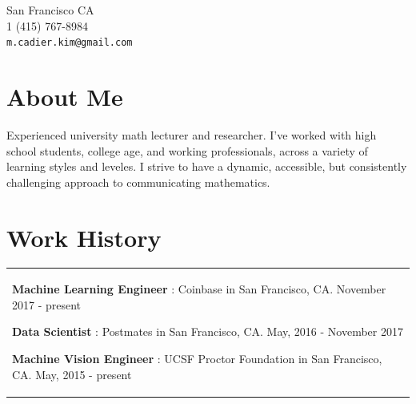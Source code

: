 \documentclass[margin,line,pifont,palatino,courier]{res}
\newenvironment{list1}{
  \begin{list}{\label{ } }{
      \setlength{\itemsep}{0in}
      \setlength{\parsep}{0in} \setlength{\parskip}{0in}
      \setlength{\topsep}{0in} \setlength{\partopsep}{0in}
      \setlength{\leftmargin}{0.0in} } }{\end{list} }
\begin{document}


\begin{resume}




\begin{flushright}
{\small
San Francisco CA \\
1 (415) 767-8984\\
  \verb+m.cadier.kim@gmail.com+
}
\end{flushright}
 
\section{\sc  About Me}
    
      
          
      
          
      
          
      
          
      
          
            Experienced university math lecturer and researcher. I've worked with high school students,
college age, and working professionals, across a variety of learning styles
and leveles.  I strive to have a dynamic, accessible, but consistently
challenging approach to communicating mathematics.
          
      


\section{\sc  Work History}
\begin{tabular}{@{}p{5in}}
  \begin{list1}
    
    
       
      \item {\bf Machine Learning Engineer }:  Coinbase in San Francisco, CA. November 2017 - present
      \vspace{.2em}
    
       
      \item {\bf Data Scientist }:  Postmates in San Francisco, CA. May, 2016 - November 2017
      \vspace{.2em}
    
       
      \item {\bf Machine Vision Engineer  }:  UCSF Proctor Foundation in San Francisco, CA. May, 2015 - present
      \vspace{.2em}
    

\end{list1}
\end{tabular}
\end{resume}
\end{document}
